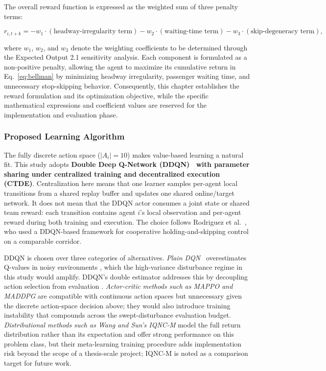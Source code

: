 The overall reward function is expressed as the weighted sum of three penalty terms:

\begin{equation}
r_{i,t+k} = -w_1 \cdot (\text{headway-irregularity term}) - w_2 \cdot (\text{waiting-time term}) - w_3 \cdot (\text{skip-degeneracy term}),
\label{eq:reward-form}
\end{equation}

where $w_1$, $w_2$, and $w_3$ denote the weighting coefficients to be determined through the Expected Output 2.1 sensitivity analysis. Each component is formulated as a non-positive penalty, allowing the agent to maximize its cumulative return in Eq.~\eqref{eq:bellman} by minimizing headway irregularity, passenger waiting time, and unnecessary stop-skipping behavior. Consequently, this chapter establishes the reward formulation and its optimization objective, while the specific mathematical expressions and coefficient values are reserved for the implementation and evaluation phase.

\subsubsection{Proposed Learning Algorithm}
\label{subsec:proposed-algorithm}

The fully discrete action space ($|A_i| = 10$) makes value-based learning a natural fit. This study adopts \textbf{Double Deep Q-Network (DDQN)~\cite{vanHasselt2016DDQN} with parameter sharing under centralized training and decentralized execution (CTDE)}. Centralization here means that one learner samples per-agent local transitions from a shared replay buffer and updates one shared online/target network. It does not mean that the DDQN actor consumes a joint state or shared team reward: each transition contains agent $i$'s local observation and per-agent reward during both training and execution. The choice follows Rodriguez et al.~\cite{Rodriguez2023Cooperative}, who used a DDQN-based framework for cooperative holding-and-skipping control on a comparable corridor.

DDQN is chosen over three categories of alternatives. \textit{Plain DQN}~\cite{Mnih2015DQN} overestimates Q-values in noisy environments \cite{vanHasselt2016DDQN,Henderson2018Matters}, which the high-variance disturbance regime in this study would amplify. DDQN's double estimator addresses this by decoupling action selection from evaluation \cite{vanHasselt2016DDQN}. \textit{Actor-critic methods such as MAPPO and MADDPG} are compatible with continuous action spaces but unnecessary given the discrete action-space decision above; they would also introduce training instability that compounds across the swept-disturbance evaluation budget. \textit{Distributional methods such as Wang and Sun's IQNC-M} \cite{Wangsun} model the full return distribution rather than its expectation and offer strong performance on this problem class, but their meta-learning training procedure adds implementation risk beyond the scope of a thesis-scale project; IQNC-M is noted as a comparison target for future work.

